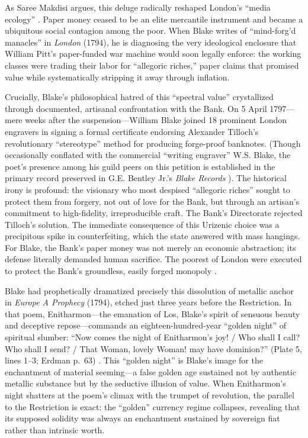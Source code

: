 \documentclass[
]{article}
\begin{document}
As Saree Makdisi argues, this deluge radically reshaped London's ``media
ecology'' \citep{makdisi2003william}. Paper money ceased to be an elite
mercantile instrument and became a ubiquitous social contagion among the
poor. When Blake writes of ``mind-forg'd manacles'' in \emph{London}
(1794), he is diagnosing the very ideological enclosure that William
Pitt's paper-funded war machine would soon legally enforce: the working
classes were trading their labor for ``allegoric riches,'' paper claims
that promised value while systematically stripping it away through
inflation.

Crucially, Blake's philosophical hatred of this ``spectral value''
crystallized through documented, artisanal confrontation with the Bank.
On 5 April 1797---mere weeks after the suspension---William Blake joined
18 prominent London engravers in signing a formal certificate endorsing
Alexander Tilloch's revolutionary ``stereotype'' method for producing
forge-proof banknotes. (Though occasionally conflated with the
commercial ``writing engraver'' W.S. Blake, the poet's presence among
his guild peers on this petition is established in the primary record
preserved in G.E. Bentley Jr.'s \emph{Blake Records}
\citep{bentley2004records}). The historical irony is profound: the
visionary who most despised ``allegoric riches'' sought to protect them
from forgery, not out of love for the Bank, but through an artisan's
commitment to high-fidelity, irreproducible craft. The Bank's
Directorate rejected Tilloch's solution. The immediate consequence of
this Urizenic choice was a precipitous spike in counterfeiting, which
the state answered with mass hangings. For Blake, the Bank's paper money
was not merely an economic abstraction; its defense literally demanded
human sacrifice. The poorest of London were executed to protect the
Bank's groundless, easily forged monopoly
\citep{baucom2005specters, erdman1954prophet, crosby2011blake}.

Blake had prophetically dramatized precisely this dissolution of
metallic anchor in \emph{Europe A Prophecy} (1794), etched just three
years before the Restriction. In that poem, Enitharmon---the emanation
of Los, Blake's spirit of sensuous beauty and deceptive
repose---commands an eighteen-hundred-year ``golden night'' of spiritual
slumber: ``Now comes the night of Enitharmon's joy! / Who shall I call?
Who shall I send? / That Woman, lovely Woman! may have dominion?''
(Plate 5, lines 1--3; Erdman p.~63) \citep{erdman1988complete}. This
``golden night'' is Blake's image for the enchantment of material
seeming---a false golden age sustained not by authentic metallic
substance but by the seductive illusion of value. When Enitharmon's
night shatters at the poem's climax with the trumpet of revolution, the
parallel to the Restriction is exact: the ``golden'' currency regime
collapses, revealing that its supposed solidity was always an
enchantment sustained by sovereign fiat rather than intrinsic worth.
\end{document}
